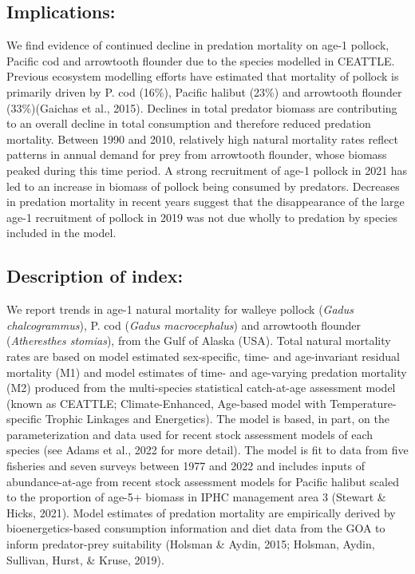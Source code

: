 \documentclass[
]{article}
\begin{document}
\hypertarget{implications}{%
\subsection{Implications:}\label{implications}}

We find evidence of continued decline in predation mortality on age-1
pollock, Pacific cod and arrowtooth flounder due to the species modelled
in CEATTLE. Previous ecosystem modelling efforts have estimated that
mortality of pollock is primarily driven by P. cod (16\%), Pacific
halibut (23\%) and arrowtooth flounder (33\%)(Gaichas et al., 2015).
Declines in total predator biomass are contributing to an overall
decline in total consumption and therefore reduced predation mortality.
Between 1990 and 2010, relatively high natural mortality rates reflect
patterns in annual demand for prey from arrowtooth flounder, whose
biomass peaked during this time period. A strong recruitment of age-1
pollock in 2021 has led to an increase in biomass of pollock being
consumed by predators. Decreases in predation mortality in recent years
suggest that the disappearance of the large age-1 recruitment of pollock
in 2019 was not due wholly to predation by species included in the
model.

\hypertarget{description-of-index}{%
\subsection{Description of index:}\label{description-of-index}}

We report trends in age-1 natural mortality for walleye pollock
(\emph{Gadus chalcogrammus}), P. cod (\emph{Gadus macrocephalus}) and
arrowtooth flounder (\emph{Atheresthes stomias}), from the Gulf of
Alaska (USA). Total natural mortality rates are based on model estimated
sex-specific, time- and age-invariant residual mortality (M1) and model
estimates of time- and age-varying predation mortality (M2) produced
from the multi-species statistical catch-at-age assessment model (known
as CEATTLE; Climate-Enhanced, Age-based model with Temperature-specific
Trophic Linkages and Energetics). The model is based, in part, on the
parameterization and data used for recent stock assessment models of
each species (see Adams et al., 2022 for more detail). The model is fit
to data from five fisheries and seven surveys between 1977 and 2022 and
includes inputs of abundance-at-age from recent stock assessment models
for Pacific halibut scaled to the proportion of age-5+ biomass in IPHC
management area 3 (Stewart \& Hicks, 2021). Model estimates of predation
mortality are empirically derived by bioenergetics-based consumption
information and diet data from the GOA to inform predator-prey
suitability (Holsman \& Aydin, 2015; Holsman, Aydin, Sullivan, Hurst, \&
Kruse, 2019).
\end{document}
